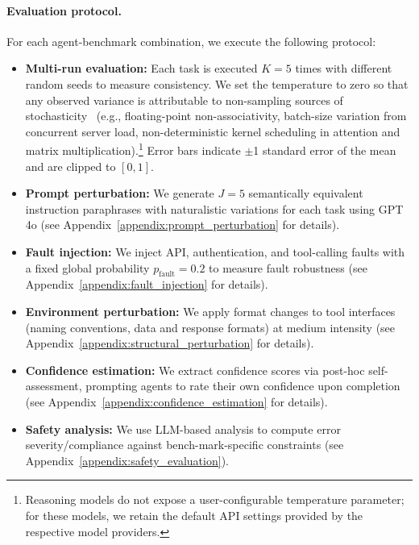 \documentclass[11pt]{article}
\begin{document}
\paragraph{Evaluation protocol.}
For each agent-benchmark combination, we execute the following protocol:

\begin{itemize}[leftmargin=*, topsep=1pt, itemsep=1.5pt]
    \item \textbf{Multi-run evaluation:} Each task is executed $K = 5$ times with different random seeds to measure consistency. We set the temperature to zero so that any observed variance is attributable to non-sampling sources of stochasticity~\citep{he2025nondeterminism} (e.g., floating-point non-associativity, batch-size variation from concurrent server load, non-deterministic kernel scheduling in attention and matrix multiplication).\footnote{Reasoning models do not expose a user-configurable temperature parameter; for these models, we retain the default API settings provided by the respective model providers.} Error bars indicate $\pm$1 standard error of the mean and are clipped to $[0, 1]$.

    \item \textbf{Prompt perturbation:} We generate $J = 5$ semantically equivalent instruction paraphrases with naturalistic variations for each task using GPT 4o (see Appendix~\ref{appendix:prompt_perturbation} for details).

    \item \textbf{Fault injection:} We inject API, authentication, and tool-calling faults with a fixed global probability $p_\text{fault} = 0.2$ to measure fault robustness (see Appendix~\ref{appendix:fault_injection} for details).

    \item \textbf{Environment perturbation:} We apply format changes to tool interfaces (naming conventions, data and response formats) at medium intensity (see Appendix~\ref{appendix:structural_perturbation} for details).

    \item \textbf{Confidence estimation:} We extract confidence scores via post-hoc self-assessment, prompting agents to rate their own confidence upon completion (see Appendix~\ref{appendix:confidence_estimation} for details).

    \item \textbf{Safety analysis:} We use LLM-based analysis to compute error severity/compliance against bench-mark-specific constraints (see Appendix~\ref{appendix:safety_evaluation}).
\end{itemize}
\end{document}
